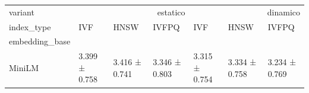 \begin{tabular}{lllllll}
\toprule
variant & \multicolumn{3}{r}{estatico} & \multicolumn{3}{r}{dinamico} \\
index_type & IVF & HNSW & IVFPQ & IVF & HNSW & IVFPQ \\
embedding_base &  &  &  &  &  &  \\
\midrule
MiniLM & 3.399 ± 0.758 & 3.416 ± 0.741 & 3.346 ± 0.803 & 3.315 ± 0.754 & 3.334 ± 0.758 & 3.234 ± 0.769 \\
\bottomrule
\end{tabular}
